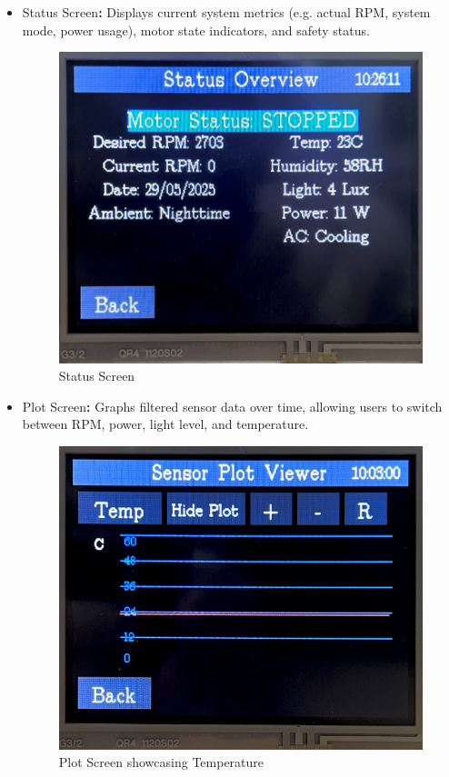 \documentclass[a4paper, 11pt, titlepage]{article}
\begin{document}
\begin{itemize}
\item Status Screen\textbf{:} Displays current system metrics (e.g. actual RPM, system mode, power usage), motor state indicators, and safety status.
\begin{figure}[H]
    \centering
    \includegraphics[width=0.7\linewidth]{images/Status.png}
    \caption{Status Screen}
    \label{fig:status_screen}
\end{figure}

\item Plot Screen\textbf{:} Graphs filtered sensor data over time, allowing users to switch between RPM, power, light level, and temperature.
\begin{figure}[H]
    \centering
    \includegraphics[width=0.7\linewidth]{images/Plot.png}
    \caption{Plot Screen showcasing Temperature}
    \label{fig:plot_screen}
\end{figure}


\end{itemize}
\end{document}
